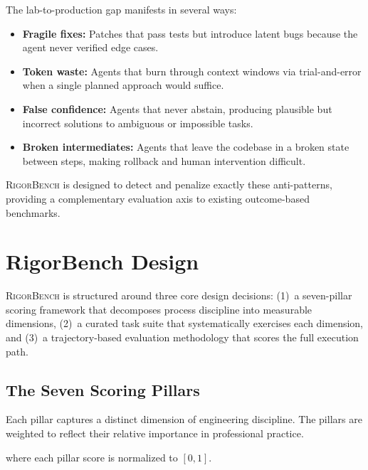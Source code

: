 \documentclass[letterpaper, 10 pt, conference]{ieeeconf}
\newcommand{\bench}{\textsc{RigorBench}}
\newcommand{\rigorscore}{\textsc{RigorScore}}
\begin{document}
The lab-to-production gap manifests in several ways:
\begin{itemize}[leftmargin=*,itemsep=2pt]
  \item \textbf{Fragile fixes:} Patches that pass tests but introduce latent bugs because the agent never verified edge cases.
  \item \textbf{Token waste:} Agents that burn through context windows via trial-and-error when a single planned approach would suffice.
  \item \textbf{False confidence:} Agents that never abstain, producing plausible but incorrect solutions to ambiguous or impossible tasks.
  \item \textbf{Broken intermediates:} Agents that leave the codebase in a broken state between steps, making rollback and human intervention difficult.
\end{itemize}

\bench{} is designed to detect and penalize exactly these anti-patterns, providing a complementary evaluation axis to existing outcome-based benchmarks.

\section{RigorBench Design}
\label{sec:design}

\bench{} is structured around three core design decisions: (1)~a seven-pillar scoring framework that decomposes process discipline into measurable dimensions, (2)~a curated task suite that systematically exercises each dimension, and (3)~a trajectory-based evaluation methodology that scores the full execution path.

\subsection{The Seven Scoring Pillars}
\label{sec:pillars}

Each pillar captures a distinct dimension of engineering discipline.
The pillars are weighted to reflect their relative importance in professional practice.

\begin{tcolorbox}[colback=lightgray, colframe=pillarblue, title={\textbf{Composite RigorScore}}, fonttitle=\bfseries]
\begin{center}
\resizebox{\linewidth}{!}{$
  \rigorscore{} = 0.15 \times \mathrm{PF} + 0.15 \times \mathrm{VC} + 0.20 \times \mathrm{RE} + 0.10 \times \mathrm{AQ} + 0.10 \times \mathrm{ATI} + 0.20 \times \mathrm{TAD} + 0.10 \times \mathrm{EE}
$}
\end{center}
where each pillar score is normalized to $[0, 1]$.
\end{tcolorbox}
\end{document}
